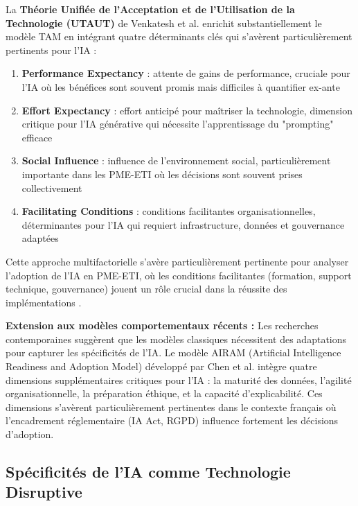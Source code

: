 La \textbf{Théorie Unifiée de l'Acceptation et de l'Utilisation de la Technologie (UTAUT)} de Venkatesh et al. \cite{venkatesh2003user} enrichit substantiellement le modèle TAM en intégrant quatre déterminants clés qui s'avèrent particulièrement pertinents pour l'IA :

\begin{enumerate}
    \item \textbf{Performance Expectancy} : attente de gains de performance, cruciale pour l'IA où les bénéfices sont souvent promis mais difficiles à quantifier ex-ante
    \item \textbf{Effort Expectancy} : effort anticipé pour maîtriser la technologie, dimension critique pour l'IA générative qui nécessite l'apprentissage du "prompting" efficace
    \item \textbf{Social Influence} : influence de l'environnement social, particulièrement importante dans les PME-ETI où les décisions sont souvent prises collectivement
    \item \textbf{Facilitating Conditions} : conditions facilitantes organisationnelles, déterminantes pour l'IA qui requiert infrastructure, données et gouvernance adaptées
\end{enumerate}

Cette approche multifactorielle s'avère particulièrement pertinente pour analyser l'adoption de l'IA en PME-ETI, où les conditions facilitantes (formation, support technique, gouvernance) jouent un rôle crucial dans la réussite des implémentations \cite{vorecol2024resistance}.

\textbf{Extension aux modèles comportementaux récents :} Les recherches contemporaines suggèrent que les modèles classiques nécessitent des adaptations pour capturer les spécificités de l'IA. Le modèle AIRAM (Artificial Intelligence Readiness and Adoption Model) développé par Chen et al. \cite{chen2024airam} intègre quatre dimensions supplémentaires critiques pour l'IA : la maturité des données, l'agilité organisationnelle, la préparation éthique, et la capacité d'explicabilité. Ces dimensions s'avèrent particulièrement pertinentes dans le contexte français où l'encadrement réglementaire (IA Act, RGPD) influence fortement les décisions d'adoption.

\subsection{Spécificités de l'IA comme Technologie Disruptive}

